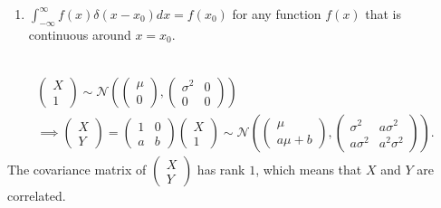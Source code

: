 \begin{exercise}
\begin{enumerate}
\begin{enumerate}
                \item $\int_{-\infty}^{\infty} f(x) \delta\left(x-x_{0}\right) d x=f\left(x_{0}\right)$
                    for any function $f(x)$ that is continuous around $x=x_{0}$.
            \end{enumerate}
            \begin{solution}
                \ \vspace{-3ex}
                \begin{gather*}
                    \begin{pmatrix}
                        X \\
                        1
                    \end{pmatrix}
                    \sim \mathcal{N}\left(
                    \begin{pmatrix}
                            \mu \\
                            0
                        \end{pmatrix},
                    \begin{pmatrix}
                            \sigma^2 & 0  \\
                            0        & 0
                        \end{pmatrix}
                    \right)\\
                    \implies
                    \begin{pmatrix}
                        X \\
                        Y
                    \end{pmatrix}
                    = 
                    \begin{pmatrix}
                        1 & 0  \\
                        a & b
                    \end{pmatrix}
                    \begin{pmatrix}
                        X \\
                        1
                    \end{pmatrix}
                    \sim \mathcal{N}\left(
                    \begin{pmatrix}
                            \mu \\
                            a\mu+b
                        \end{pmatrix},
                    \begin{pmatrix}
                            \sigma^2  & a\sigma^2    \\    
                            a\sigma^2 & a^2\sigma^2
                        \end{pmatrix}
                    \right).
                \end{gather*}
                The covariance matrix of $\begin{pmatrix}X\\Y\end{pmatrix}$ has rank $1$, which means that $X$ and $Y$ are correlated.
                

\end{solution}
\end{enumerate}
\end{exercise}
